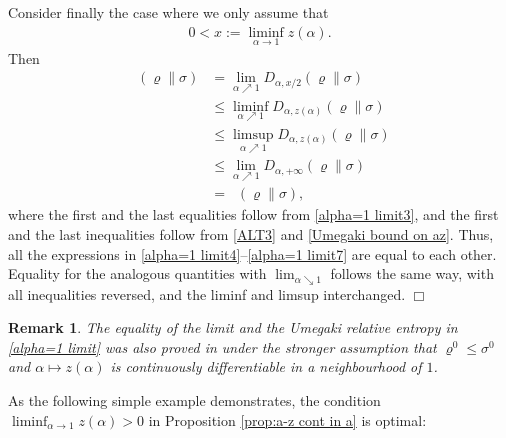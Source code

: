 \documentclass[unsortedaddress,superscriptaddress,pra,notitlepage]{revtex4}
\newtheorem{rem}[definition]{Remark}
\newenvironment{proof}[1][Proof]{\begin{trivlist}
\item[\hskip \labelsep {\bfseries #1}]}{\hfill$\Box$\end{trivlist}}
\def\rho{\varrho}
\DeclareMathOperator{\DU}{\mathit{D}^{Um}}
\begin{document}
\begin{proof}
Consider finally the case where we only assume that 
\begin{align*}
0<x:=\liminf_{\alpha\to 1}z(\alpha).
\end{align*}
Then
\begin{align}
\DU(\rho\|\sigma)
&=
\lim_{\alpha\nearrow 1}D_{\alpha,x/2}(\rho\|\sigma\label{alpha=1 limit4})\\
&\le
\liminf_{\alpha\nearrow 1}D_{\alpha,z(\alpha)}(\rho\|\sigma)\label{alpha=1 limit5}\\
&\le
\limsup_{\alpha\nearrow 1}D_{\alpha,z(\alpha)}(\rho\|\sigma)\label{alpha=1 limit6}\\
&\le
\lim_{\alpha\nearrow 1}D_{\alpha,+\infty}(\rho\|\sigma)\label{alpha=1 limit7}\\
&=
\DU(\rho\|\sigma),
\end{align}
where the first and the last equalities follow from \eqref{alpha=1 limit3},
and the first and the last inequalities follow from 
\eqref{ALT3} and \eqref{Umegaki bound on az}. Thus, all the expressions in \eqref{alpha=1 limit4}--\eqref{alpha=1 limit7}
are equal to each other. Equality for the analogous quantities with 
$\lim_{\alpha\searrow 1}$ follows the same way, with all inequalities reversed, and 
the liminf and limsup interchanged.
\end{proof}

\begin{rem}
The equality of the limit and the Umegaki relative entropy in
\eqref{alpha=1 limit} was also proved in \cite{LinTomamichel15} under the stronger assumption that 
$\rho^0\le\sigma^0$ and $\alpha\mapsto z(\alpha)$ is continuously differentiable in a neighbourhood of $1$.
\end{rem}

As the following simple example demonstrates, the condition 
$\liminf_{\alpha\to 1}z(\alpha)>0$ in Proposition 
\ref{prop:a-z cont in a} is optimal:
\end{document}
